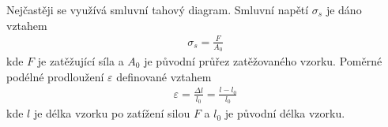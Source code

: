 \documentclass[letterpaper,10pt,english]{jupyterBook}
\begin{document}
\sphinxAtStartPar
Nejčastěji se využívá smluvní tahový diagram. Smluvní napětí \(\sigma_s\) je dáno vztahem
\begin{equation*}
\begin{split}\sigma_s = \frac{F}{A_0}\end{split}
\end{equation*}
\sphinxAtStartPar
kde \(F\) je zatěžující síla a \(A_0\) je původní průřez zatěžovaného vzorku. Poměrné podélné prodloužení \(\varepsilon\) definované vztahem
\begin{equation*}
\begin{split}\varepsilon = \frac{\Delta l}{l_0} = \frac{l - l_0}{l_0}\end{split}
\end{equation*}
\sphinxAtStartPar
kde \(l\) je délka vzorku po zatížení silou \(F\) a \(l_0\) je původní délka vzorku.
\end{document}
